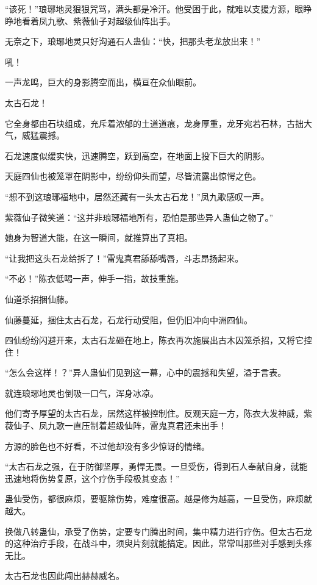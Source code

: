 \begin{this_body}
“该死！”琅琊地灵狠狠咒骂，满头都是冷汗。他受困于此，就难以支援方源，眼睁睁地看着凤九歌、紫薇仙子对超级仙阵出手。

无奈之下，琅琊地灵只好沟通石人蛊仙：“快，把那头老龙放出来！”

吼！

一声龙鸣，巨大的身影腾空而出，横亘在众仙眼前。

太古石龙！

它全身都由石块组成，充斥着浓郁的土道道痕，龙身厚重，龙牙宛若石林，古拙大气，威猛震撼。

石龙速度似缓实快，迅速腾空，跃到高空，在地面上投下巨大的阴影。

天庭四仙也被笼罩在阴影中，纷纷仰头而望，尽皆流露出惊愕之色。

“想不到这琅琊福地中，居然还藏有一头太古石龙！”凤九歌感叹一声。

紫薇仙子微笑道：“这并非琅琊福地所有，恐怕是那些异人蛊仙之物了。”

她身为智道大能，在这一瞬间，就推算出了真相。

“让我把这头石龙给拆了！”雷鬼真君舔舔嘴唇，斗志昂扬起来。

“不必！”陈衣低喝一声，伸手一指，故技重施。

仙道杀招捆仙藤。

仙藤蔓延，捆住太古石龙，石龙行动受阻，但仍旧冲向中洲四仙。

四仙纷纷闪避开来，太古石龙砸在地上，陈衣再次施展出古木囚笼杀招，又将它控住！

“怎么会这样！？”异人蛊仙们见到这一幕，心中的震撼和失望，溢于言表。

就连琅琊地灵也倒吸一口气，浑身冰凉。

他们寄予厚望的太古石龙，居然这样被控制住。反观天庭一方，陈衣大发神威，紫薇仙子、凤九歌一直压制着超级仙阵，雷鬼真君还未出手！

方源的脸色也不好看，不过他却没有多少惊讶的情绪。

“太古石龙之强，在于防御坚厚，勇悍无畏。一旦受伤，得到石人奉献自身，就能迅速地将伤势复原，这个疗伤手段极其变态！”

蛊仙受伤，都很麻烦，要驱除伤势，难度很高。越是修为越高，一旦受伤，麻烦就越大。

换做八转蛊仙，承受了伤势，定要专门腾出时间，集中精力进行疗伤。但太古石龙的这种治疗手段，在战斗中，须臾片刻就能搞定。因此，常常叫那些对手感到头疼无比。

太古石龙也因此闯出赫赫威名。


\end{this_body}
